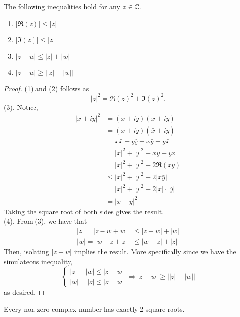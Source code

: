 \documentclass[11pt]{article}
\begin{document}
\begin{prop}
The following inequalities hold for any $z \in \mathbb{C}$.
\begin{enumerate}
\item $|\Re(z)| \leq |z|$
\item $|\Im(z)| \leq |z|$
\item $|z + w| \leq |z| + |w|$
\item $|z + w| \geq \bigg| |z| - |w|\bigg|$
\end{enumerate}
\begin{proof}
(1) and (2) follows as
\begin{equation*}
|z|^2 = \Re(z)^2 + \Im(z)^2. 
\end{equation*}
(3). Notice,
\begin{align*}
|x + iy|^2 &= (x + iy)\bar{(x + iy)}\\
&= (x + iy)(\bar{x} + \bar{iy})\\
&= x\bar x + y \bar y + x \bar y + y \bar x\\
&= |x|^2 + |y|^2 + x \bar y + y \bar x\\
&= |x|^2 + |y|^2 + 2\Re(x\bar y)\\
&\leq |x|^2 + |y|^2 + 2|x\bar y|\\
&= |x|^2 + |y|^2 + 2|x| \cdot |\bar y|\\
&= |x + y|^2
\end{align*}
Taking the square root of both sides gives the result.\\

(4). From (3), we have that
\begin{align*}
|z| = |z - w + w| &\leq |z - w| + |w|\\ 
|w| = |w - z + z| &\leq |w - z| + |z|
\end{align*}
Then, isolating $|z - w|$ implies the result. More specifically since we have the simulateous inequality,
\begin{equation*}
\begin{cases}
|z| - |w| \leq |z - w| \\
|w| - |z| \leq |z - w|
\end{cases}
\Rightarrow
|z - w| \geq \bigg| |z| - |w| \bigg|
\end{equation*}
as desired.
\end{proof}
\end{prop}
\begin{prop}
Every non-zero complex number has exactly 2 square roots.
\end{prop}
\end{document}
